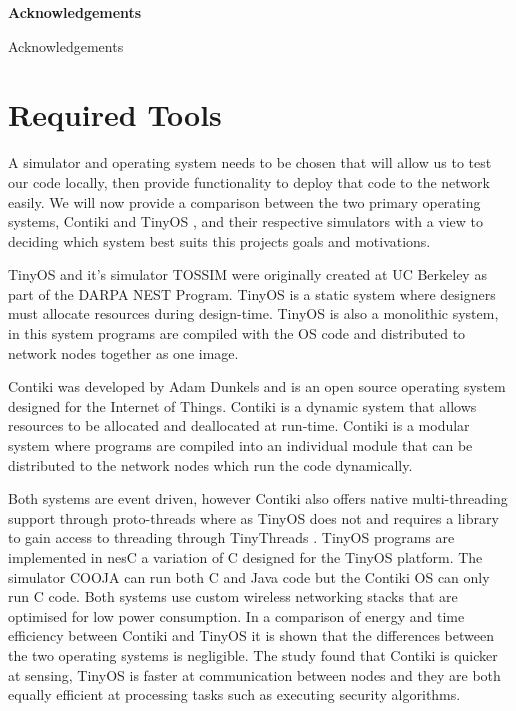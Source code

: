 \documentclass[a4paper,notitlepage]{article}
\makeatletter
\newcommand\ackname{Acknowledgements}
\newenvironment{acknowledgements}{%
      \titlepage
      \null\vfil
      \@beginparpenalty\@lowpenalty
      \begin{center}%
        \bfseries \ackname
        \@endparpenalty\@M
      \end{center}}%
     {\par\vfil\null\endtitlepage}
\newenvironment{acknowledgements}{%
      \if@twocolumn
        \section*{\abstractname}%
      \else
        \small
        \begin{center}%
          {\bfseries \ackname\vspace{-.5em}\vspace{\z@}}%
        \end{center}%
        \quotation
      \fi}
      {\if@twocolumn\else\endquotation\fi}
\makeatother
\begin{document}
\pagestyle{empty}
\thispagestyle{empty}

\newpage

\begin{acknowledgements}
Acknowledgements
\end{acknowledgements}
\newpage


\pagestyle{plain}
\setcounter{page}{1}

\tableofcontents
\clearpage




\clearpage

\section{Required Tools}

A simulator and operating system needs to be chosen that will allow us to test our code locally, then provide functionality to deploy that code to the network easily. We will now provide a comparison between the two primary operating systems, Contiki \cite{23839452} and TinyOS \cite{levis2003tossim}, and their respective simulators with a view to deciding which system best suits this projects goals and motivations.

TinyOS and it's simulator TOSSIM were originally created at UC Berkeley as part of the DARPA NEST Program. TinyOS is a static system where designers must allocate resources during design-time. TinyOS is also a monolithic system, in this system programs are compiled with the OS code and distributed to network nodes together as one image.

Contiki was developed by Adam Dunkels and is an open source operating system designed for the Internet of Things. Contiki is a dynamic system that allows resources to be allocated and deallocated at run-time. Contiki is a modular system where programs are compiled into an individual module that can be distributed to the network nodes which run the code dynamically.

Both systems are event driven, however Contiki also offers native multi-threading support through proto-threads where as TinyOS does not and requires a library to gain access to threading through TinyThreads \cite{?}. TinyOS programs are implemented in nesC a variation of C designed for the TinyOS platform. The simulator COOJA can run both C and Java code but the Contiki OS can only run C code. Both systems use custom wireless networking stacks that are optimised for low power consumption. In a comparison of energy and time efficiency between Contiki and TinyOS \cite{?} it is shown that the differences between the two operating systems is negligible. The study found that Contiki is quicker at sensing, TinyOS is faster at communication between nodes and they are both equally efficient at processing tasks such as executing security algorithms.
\end{document}
